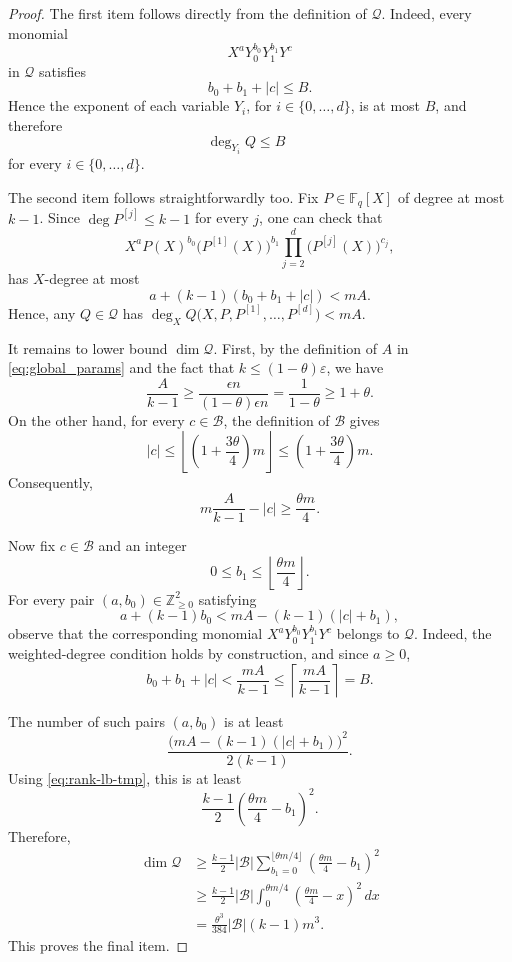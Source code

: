 \documentclass[11pt]{article}
\newcommand{\eps}{\varepsilon}
\begin{document}
\begin{proof}
The first item follows directly from the definition of $\mathcal Q$.
Indeed, every monomial
\[
X^aY_0^{b_0}Y_1^{b_1}Y^c
\]
in $\mathcal Q$ satisfies
\[
b_0+b_1+|c|\le B.
\]
Hence the exponent of each variable $Y_i$, for $i\in\{0,\ldots,d\}$, is at
most $B$, and therefore
\[
\deg_{Y_i}Q\le B
\qquad
\]
for every $i \in \{0,\ldots, d\}$.

The second item follows straightforwardly too. Fix $P\in\mathbb F_q[X]$ of degree at most $k-1$. Since $\deg P^{[j]}\le k-1$
for every $j$, one can check that
\[
X^a
P(X)^{b_0}
\bigl(P^{[1]}(X)\bigr)^{b_1}
\prod_{j=2}^{d}
\bigl(P^{[j]}(X)\bigr)^{c_j},
\]
has $X$-degree at most
\[
a+(k-1)(b_0+b_1+|c|)<mA.
\]
Hence, any $Q \in \mathcal{Q}$ has $\deg_X
Q\bigl(X,P,P^{[1]},\ldots,P^{[d]}\bigr)
<mA$.

It remains to lower bound $\dim\mathcal Q$. First, by the definition of $A$ in \eqref{eq:global_params} and the fact that $k \leq (1-\theta) \eps$, we have
\[
\frac{A}{k-1}
\ge
\frac{\epsilon n}{(1-\theta)\epsilon n}
=
\frac{1}{1-\theta}
\ge
1+\theta.
\]
On the other hand, for every $c\in\mathcal B$, the definition of
$\mathcal B$ gives
\[
|c|
\le
\left\lfloor
\left(1+\frac{3\theta}{4}\right)m
\right\rfloor
\le
\left(1+\frac{3\theta}{4}\right)m.
\]
Consequently,
\begin{equation}\label{eq:rank-lb-tmp}
m\frac{A}{k-1}-|c|
\ge
\frac{\theta m}{4}.
\end{equation}

Now fix $c\in\mathcal B$ and an integer
\[
0\le b_1\le
\left\lfloor\frac{\theta m}{4}\right\rfloor.
\]
For every pair $(a,b_0)\in\mathbb Z_{\ge0}^2$ satisfying
\[
a+(k-1)b_0
<
mA-(k-1)(|c|+b_1),
\]
observe that the corresponding monomial $X^aY_0^{b_0}Y_1^{b_1}Y^c$
belongs to $\mathcal Q$. Indeed, the weighted-degree condition holds by
construction, and since $a\ge0$,
\[
b_0+b_1+|c|
<
\frac{mA}{k-1}
\le
\left\lceil\frac{mA}{k-1}\right\rceil
=
B.
\]

The number of such pairs $(a,b_0)$ is at least
\[
\frac{
\bigl(mA-(k-1)(|c|+b_1)\bigr)^2
}{
2(k-1)
}.
\]
Using \eqref{eq:rank-lb-tmp}, this is at least
\[
\frac{k-1}{2}
\left(
\frac{\theta m}{4}-b_1
\right)^2.
\]
Therefore,
\[
\begin{aligned}
\dim\mathcal Q
&\ge
\frac{k-1}{2}
|\mathcal B|
\sum_{b_1=0}^{\lfloor\theta m/4\rfloor}
\left(
\frac{\theta m}{4}-b_1
\right)^2\\
&\ge
\frac{k-1}{2}
|\mathcal B|
\int_0^{\theta m/4}
\left(
\frac{\theta m}{4}-x
\right)^2\,dx\\
&=
\frac{\theta^3}{384}
|\mathcal B|(k-1)m^3.
\end{aligned}
\]
This proves the final item.
\end{proof}
\end{document}
